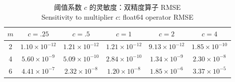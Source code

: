 \begin{table}[H]
\centering
\caption{阈值系数 $c$ 的灵敏度：双精度算子 RMSE\\Sensitivity to multiplier $c$: float64 operator RMSE}
\label{tab:c-sweep}
\small
\begin{tabular}{cccccc}
\toprule
$m$ & $c=.25$ & $c=.5$ & $c=1$ & $c=2$ & $c=4$\\
\midrule
2 & $1.10\times10^{-12}$ & $1.21\times10^{-12}$ & $1.21\times10^{-12}$ & $9.13\times10^{-12}$ & $1.85\times10^{-10}$\\
4 & $5.60\times10^{-9}$ & $5.09\times10^{-10}$ & $2.84\times10^{-10}$ & $1.34\times10^{-9}$ & $2.30\times10^{-8}$\\
6 & $4.41\times10^{-7}$ & $2.32\times10^{-8}$ & $1.20\times10^{-8}$ & $1.85\times10^{-6}$ & $3.37\times10^{-5}$\\
\bottomrule
\end{tabular}
\end{table}
